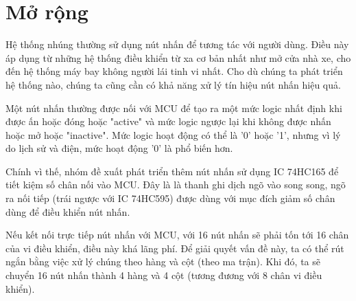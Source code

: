 \section{Mở rộng}
Hệ thống nhúng thường sử dụng nút nhấn để tương tác với người dùng. Điều này áp dụng từ những hệ thống điều khiển từ xa cơ bản nhất như mở cửa nhà xe, cho đến hệ thống máy bay không người lái tinh vi nhất. Cho dù chúng ta phát triển hệ thống nào, chúng ta cũng cần có khả năng xử lý tín hiệu nút nhấn hiệu quả.

Một nút nhấn thường được nối với MCU để tạo ra một mức logic nhất định khi được ấn hoặc đóng hoặc "active" và mức logic ngược lại khi không được nhấn hoặc mở hoặc "inactive". Mức logic hoạt động có thể là '0' hoặc '1', nhưng vì lý do lịch sử và điện, mức hoạt động '0' là phổ biến hơn.

Chính vì thế, nhóm đề xuất phát triển thêm nút nhấn sử dụng IC 74HC165 để tiết kiệm số chân nối vào MCU. Đây là là thanh ghi dịch ngõ vào song song, ngõ ra nối tiếp (trái ngược với IC 74HC595) được dùng với mục đích giảm số chân dùng để điều khiển nút nhấn.

Nếu kết nối trực tiếp nút nhấn với MCU, với 16 nút nhấn sẽ phải tốn tới 16 chân của vi điều khiển, điều này khá lãng phí. Để giải quyết vấn đề này, ta có thể rút ngắn bằng việc xử lý chúng theo hàng và cột (theo ma trận). Khi đó, ta sẽ chuyển 16 nút nhấn thành 4 hàng và 4 cột (tương đương với 8 chân vi điều khiển).